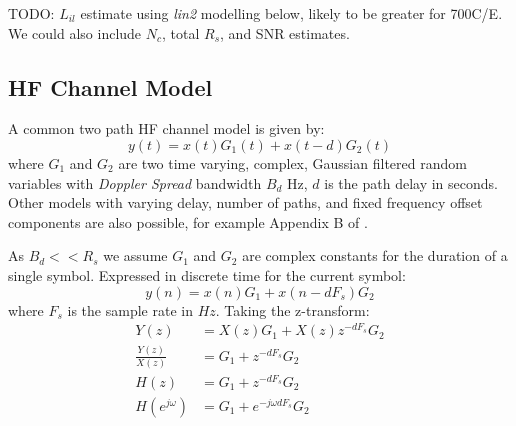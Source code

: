 \documentclass{article}
\begin{document}
TODO: $L_{il}$ estimate using \emph{lin2} modelling below, likely to be greater for 700C/E.  We could also include ${N_c}$, total $R_s$, and SNR estimates.

\subsection{HF Channel Model}

A common two path HF channel model \cite{itu1487} is given by:
\begin{equation}
y(t) = x(t)G_1(t) + x(t-d)G_2(t)
\end{equation}
where $G_1$ and $G_2$ are two time varying, complex, Gaussian filtered random variables with \emph{Doppler Spread} bandwidth $B_d$ Hz, $d$ is the path delay in seconds. Other models with varying delay, number of paths, and fixed frequency offset components are also possible, for example Appendix B of \cite{etsi201}.

As $B_d<< R_s$ we assume $G_1$ and $G_2$ are complex constants for the duration of a single symbol. Expressed in discrete time for the current symbol:
\begin{equation}
\label{eq:hf_model_time}
y(n) = x(n)G_1 + x(n-dF_s)G_2
\end{equation}
where $F_s$ is the sample rate in $\si{Hz}$.  Taking the z-transform:
\begin{equation}
\label{eq:hf_model_freq}
\begin{split}
Y(z) &= X(z)G_1+X(z)z^{-dF_s}G_2 \\
\frac{Y(z)}{X(z)} &= G_1+z^{-dF_s}G_2 \\
H(z) &= G_1+z^{-dF_s}G_2 \\
H(e^{j \omega}) &= G_1+e^{-j \omega d F_s}G_2
\end{split}
\end{equation}
\end{document}
